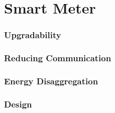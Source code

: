 \chapter{Smart Meter}


\subsection{Upgradability}

\subsection{Reducing Communication}

\subsection{Energy Disaggregation}

\subsection{Design}




















